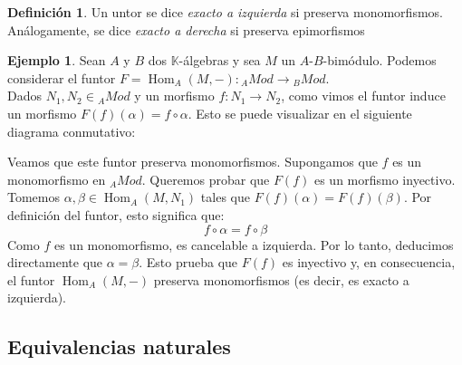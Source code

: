 \documentclass{article}
\theoremstyle{plain}
\theoremstyle{definition}
\newtheorem{definition}[theorem]{Definición}
\newtheorem{ejemplo}[theorem]{Ejemplo}
\theoremstyle{remark}
\begin{document}
\begin{definition}
    Un untor se dice \textit{exacto a izquierda} si preserva monomorfismos. Análogamente, se dice \textit{exacto a derecha} si preserva epimorfismos
\end{definition}

\begin{ejemplo}
    Sean $A$ y $B$ dos $\mathbb{K}$-álgebras y sea $M$ un $A$-$B$-bimódulo. Podemos considerar el funtor $F = \operatorname{Hom}_A(M, -): {}_A Mod \longrightarrow {}_B Mod$. \\
    
    Dados $N_1, N_2 \in {}_A Mod$ y un morfismo $f: N_1 \to N_2$, como vimos el funtor induce un morfismo $F(f)(\alpha) = f \circ \alpha$. Esto se puede visualizar en el siguiente diagrama conmutativo:

    \begin{center}
    \end{center}

    Veamos que este funtor preserva monomorfismos. Supongamos que $f$ es un monomorfismo en ${}_A Mod$. Queremos probar que $F(f)$ es un morfismo inyectivo.  \\
    
    Tomemos $\alpha, \beta \in \operatorname{Hom}_A(M, N_1)$ tales que $F(f)(\alpha) = F(f)(\beta)$. Por definición del funtor, esto significa que:
    \begin{equation*}
        f \circ \alpha = f \circ \beta
    \end{equation*}
    Como $f$ es un monomorfismo, es cancelable a izquierda. Por lo tanto, deducimos directamente que $\alpha = \beta$. Esto prueba que $F(f)$ es inyectivo y, en consecuencia, el funtor $\operatorname{Hom}_A(M,-)$ preserva monomorfismos (es decir, es exacto a izquierda).
\end{ejemplo}

\subsection{Equivalencias naturales}
\end{document}
